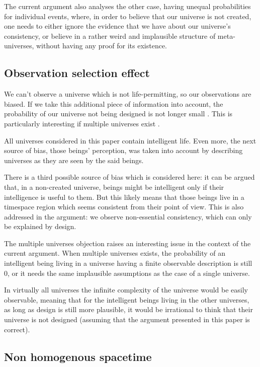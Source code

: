 \documentclass[a4paper
,draft
]{article}
\newcommand{\paper}[1]{paper}
\begin{document}
The current argument also analyses the other case, having unequal probabilities
for individual events, where, in order to believe that our universe is not
created, one needs to either ignore the evidence that we have about our
universe's consistency, or believe in a rather weird and implausible structure
of meta-universes, without having any proof for its existence.

\subsection{Observation selection effect}

We can't observe a universe which is not life-permitting,
so our observations are biased.
If we take this additional piece of information into account,
the probability of our universe not being designed is not longer
small \parencite{Sober2009}.
This is particularly interesting if multiple universes
exist \parencite{Manson2009}.

All universes considered in this paper contain intelligent life. Even
more, the next source of bias, those beings' perception, was taken into account
by describing universes as they are seen by the said beings.

There is a third possible source of bias which is considered here: it can be
argued that, in a non-created universe, beings might be intelligent
only if their intelligence is useful to them. But this likely means that those
beings live in a timespace region which seems consistent from their point of
view. This is also addressed in the argument: we observe non-essential
consistency, which can only be explained by design.

The multiple universes objection raises an interesting issue in the context
of the current argument.
When multiple universes exists, the probability of an intelligent being
living in a universe having a finite observable description is still $0$, or
it needs the same implausible assumptions as the case of a single universe.

In virtually all universes the infinite complexity of the universe would be
easily observable, meaning that for the intelligent beings living in the
other universes, as long as design is still more plausible,
it would be irrational to think that
their universe is not designed (assuming that the argument presented in
this \paper{} is correct).

\subsection{Non homogenous spacetime}
\end{document}
